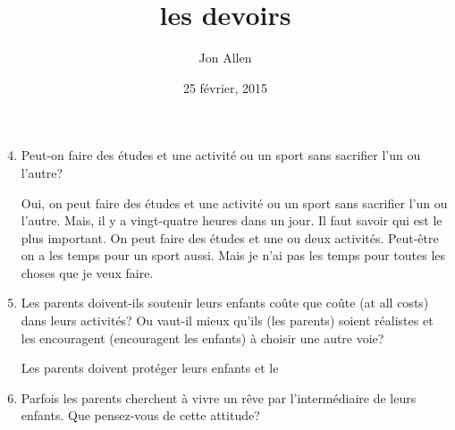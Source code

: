 \documentclass[letterpaper]{article}
\begin{document}
\title{les devoirs}
\date{25 février, 2015}
\author{Jon Allen}
\maketitle
\doublespacing
\begin{enumerate}
\setcounter{enumi}{3}
\item
Peut-on faire des études et une activité ou un sport sans sacrifier l'un ou l'autre?

Oui, on peut faire des études et une activité ou un sport sans sacrifier l'un ou l'autre. Mais, il y a vingt-quatre heures dans un jour. Il faut savoir qui est le plus important. On peut faire des études et une ou deux activités. Peut-être on a les temps pour un sport aussi. Mais je n'ai pas les temps pour toutes les choses que je veux faire.
\item
Les parents doivent-ils soutenir leurs enfants coûte que coûte (at all costs) dans leurs activités?  Ou vaut-il mieux qu'ils (les parents) soient réalistes et les encouragent (encouragent les enfants) à choisir une autre voie?

Les parents doivent protéger leurs enfants et le
\item
Parfois les parents cherchent à vivre un rêve par l'intermédiaire de leurs enfants.  Que pensez-vous de cette attitude?
\end{enumerate}
\end{document}
